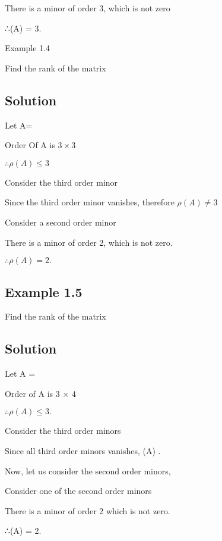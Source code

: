 \documentclass[12pt, a4paper]{article}
\begin{document}
There is a minor of order 3, which is not zero

∴\rho (A) = 3.

\newpage 
 

Example 1.4

Find the rank of the matrix 

\bigskip \subsection*{Solution}

Let A= 

Order Of A is $3 \times 3$

$\therefore \rho (A) \leq 3$

Consider the third order minor 

Since the third order minor vanishes, therefore $\rho(A) \neq  3$

Consider a second order minor 

There is a minor of order 2, which is not zero.

$\therefore \rho(A) = 2.$

\newpage 

\subsection*{Example 1.5}

Find the rank of the matrix 

\bigskip \subsection*{Solution}

Let A = 

Order of A is 3 × 4

$\therefore \rho(A)\leq 3.$

Consider the third order minors



Since all third order minors vanishes, \rho(A) .

Now, let us consider the second order minors,

Consider one of the second order minors 

There is a minor of order 2 which is not zero.

∴\rho (A) = 2.




\newpage 
\end{document}
